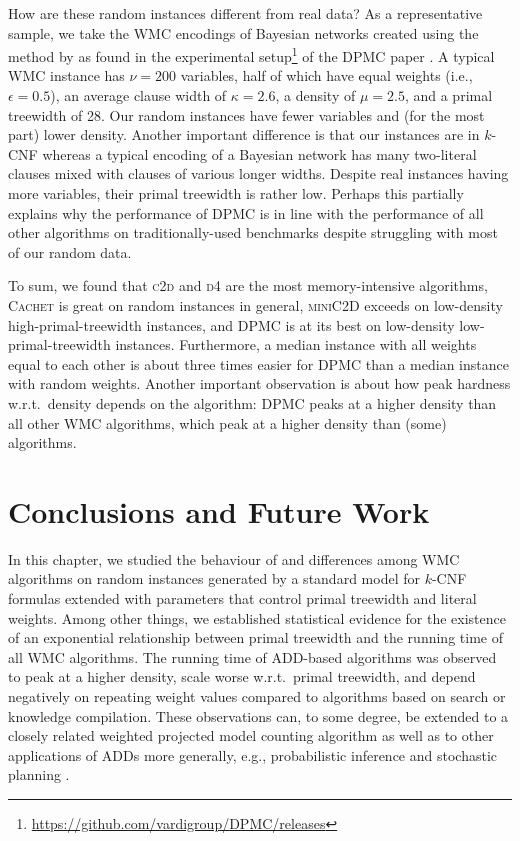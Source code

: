 How are these random instances different from real data? As a representative
sample, we take the WMC encodings of Bayesian networks created using the method
by \citet{DBLP:conf/aaai/SangBK05} as found in the experimental
setup\footnote{\url{https://github.com/vardigroup/DPMC/releases}} of the
\textsc{DPMC} paper \citep{DBLP:conf/cp/DudekPV20}. A typical WMC instance has
$\nu = 200$ variables, half of which have equal weights (i.e.,
$\epsilon = 0.5$), an average clause width of $\kappa = 2.6$, a density of
$\mu = 2.5$, and a primal treewidth of 28. Our random instances have fewer
variables and (for the most part) lower density. Another important difference is
that our instances are in $k$-CNF whereas a typical encoding of a Bayesian
network has many two-literal clauses mixed with clauses of various longer
widths. Despite real instances having more variables, their primal treewidth is
rather low. Perhaps this partially explains why the performance of \textsc{DPMC}
is in line with the performance of all other algorithms on traditionally-used
benchmarks \citep{DBLP:conf/cp/DudekPV20} despite struggling with most of our
random data.

To sum, we found that \textsc{c2d} and \textsc{d4} are the most memory-intensive
algorithms, \textsc{Cachet} is great on random instances in general,
\textsc{miniC2D} exceeds on low-density high-primal-treewidth instances, and
\textsc{DPMC} is at its best on low-density low-primal-treewidth instances.
Furthermore, a median instance with all weights equal to each other is about
three times easier for \textsc{DPMC} than a median instance with random weights.
Another important observation is about how peak hardness w.r.t.\ density depends
on the algorithm: \textsc{DPMC} peaks at a higher density than all other WMC
algorithms, which peak at a higher density than (some) \mc{} algorithms.

\section{Conclusions and Future Work}

In this chapter, we studied the behaviour of and differences among WMC
algorithms on random instances generated by a standard model for $k$-CNF
formulas extended with parameters that control primal treewidth and literal
weights. Among other things, we established statistical evidence for the
existence of an exponential relationship between primal treewidth and the
running time of all WMC algorithms. The running time of ADD-based algorithms was
observed to peak at a higher density, scale worse w.r.t.\ primal treewidth, and
depend negatively on repeating weight values compared to algorithms based on
search or knowledge compilation. These observations can, to some degree, be
extended to a closely related weighted projected model counting algorithm
\citep{DBLP:conf/sat/DudekPV21} as well as to other applications of ADDs more
generally, e.g., probabilistic inference
\citep{DBLP:conf/ijcai/ChaviraD07,DBLP:conf/uai/GogateD11} and stochastic
planning \citep{DBLP:conf/uai/HoeySHB99}.

